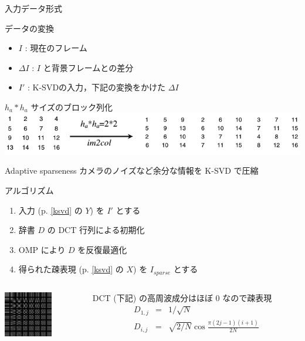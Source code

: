 \begin{frame}{入力データ形式}
\begin{block}{データの変換}
\begin{itemize}
 \item $I$ : 現在のフレーム
 \item $\Delta I$ : $I$ と背景フレームとの差分
 \item $I'$ : K-SVDの入力，下記の変換をかけた $\Delta I$
\end{itemize}
\end{block}
$h_a * h_a$ サイズのブロック列化
\includegraphics[scale=0.5]{figure/im2col.png}
\end{frame}


\begin{frame}{Adaptive sparseness}
カメラのノイズなど余分な情報を K-SVD で圧縮

\begin{block}{アルゴリズム}
\begin{enumerate}
    \item 入力 (p. \ref{ksvd} の $Y$) を $I'$ とする
    \item 辞書 $D$ の DCT 行列による初期化
    \item OMP により $D$ を反復最適化
    \item 得られた疎表現 (p. \ref{ksvd} の $X$) を $I_{sparse}$ とする
\end{enumerate}
\end{block}
    \begin{columns}
        \begin{column}{0.2\textwidth} %
            \includegraphics[height=2cm]{figure/dct.png}
        \end{column}
        \begin{column}{0.8\textwidth} %
        DCT (下記) の高周波成分はほぼ 0 なので疎表現
        \begin{eqnarray}
            D_{1,j} & = & 1 / \sqrt{N} \\
            D_{i,j} & = & \sqrt{2/N} \cos{\frac{\pi (2j - 1) (i + 1)}{2 N}}
        \end{eqnarray}
        \end{column}
    \end{columns}

\end{frame}



